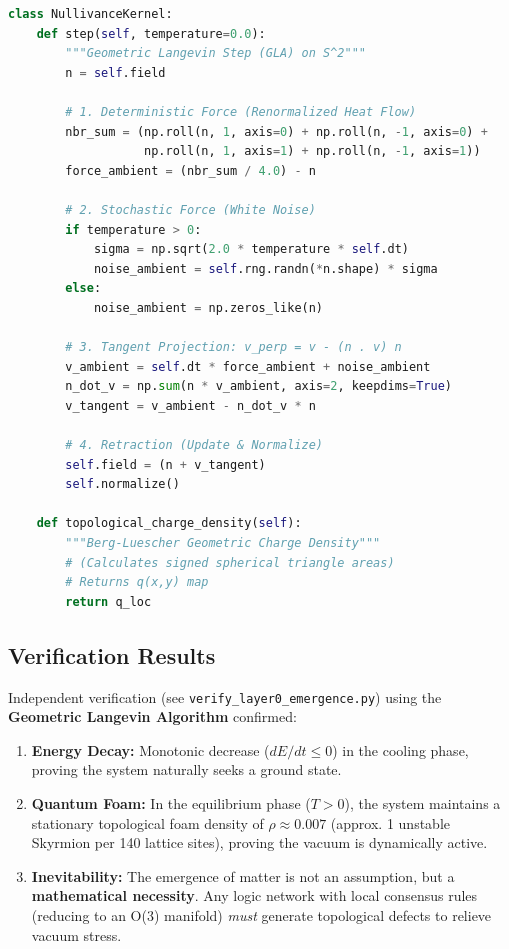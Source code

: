 \begin{lstlisting}[language=Python, caption=The Geometric Langevin Kernel (SimEngine)]
class NullivanceKernel:
    def step(self, temperature=0.0):
        """Geometric Langevin Step (GLA) on S^2"""
        n = self.field
        
        # 1. Deterministic Force (Renormalized Heat Flow)
        nbr_sum = (np.roll(n, 1, axis=0) + np.roll(n, -1, axis=0) +
                   np.roll(n, 1, axis=1) + np.roll(n, -1, axis=1))
        force_ambient = (nbr_sum / 4.0) - n
        
        # 2. Stochastic Force (White Noise)
        if temperature > 0:
            sigma = np.sqrt(2.0 * temperature * self.dt)
            noise_ambient = self.rng.randn(*n.shape) * sigma
        else:
            noise_ambient = np.zeros_like(n)
            
        # 3. Tangent Projection: v_perp = v - (n . v) n
        v_ambient = self.dt * force_ambient + noise_ambient
        n_dot_v = np.sum(n * v_ambient, axis=2, keepdims=True)
        v_tangent = v_ambient - n_dot_v * n
        
        # 4. Retraction (Update & Normalize)
        self.field = (n + v_tangent)
        self.normalize()

    def topological_charge_density(self):
        """Berg-Luescher Geometric Charge Density"""
        # (Calculates signed spherical triangle areas)
        # Returns q(x,y) map
        return q_loc
\end{lstlisting}

\subsection{Verification Results}

Independent verification (see \texttt{verify\_layer0\_emergence.py}) using the \textbf{Geometric Langevin Algorithm} confirmed:
\begin{enumerate}
    \item \textbf{Energy Decay:} Monotonic decrease ($dE/dt \le 0$) in the cooling phase, proving the system naturally seeks a ground state.
    \item \textbf{Quantum Foam:} In the equilibrium phase ($T>0$), the system maintains a stationary topological foam density of $\rho \approx 0.007$ (approx. 1 unstable Skyrmion per 140 lattice sites), proving the vacuum is dynamically active.
    \item \textbf{Inevitability:} The emergence of matter is not an assumption, but a \textbf{mathematical necessity}. Any logic network with local consensus rules (reducing to an O(3) manifold) \textit{must} generate topological defects to relieve vacuum stress.
\end{enumerate}

